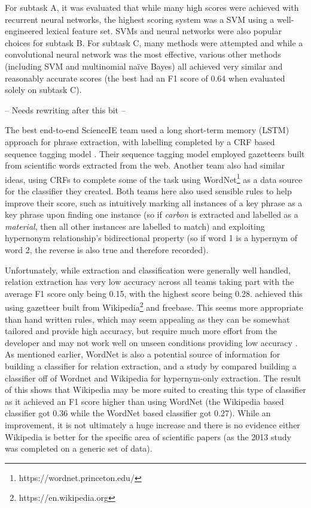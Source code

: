 For subtask A, it was evaluated that while many high scores were achieved with recurrent neural networks, the highest scoring system was a SVM using a well-engineered lexical feature set. SVMs and neural networks were also popular choices for subtask B. For subtask C, many methods were attempted and while a convolutional neural network was the most effective, various other methods (including SVM and multinomial naïve Bayes) all achieved very similar and reasonably accurate scores (the best had an F1 score of 0.64 when evaluated solely on subtask C).

-- Needs rewriting after this bit --

The best end-to-end ScienceIE team used a long short-term memory (LSTM) approach for phrase extraction, with labelling completed by a CRF based sequence tagging model \cite{Ammar2017}. Their sequence tagging model employed gazetteers built from scientific words extracted from the web. Another team \cite{Marsi2017} also had similar ideas, using CRFs to complete some of the task using WordNet\footnote{https://wordnet.princeton.edu/} as a data source for the classifier they created. Both teams here also used sensible rules to help improve their score, such as intuitively marking all instances of a key phrase as a key phrase upon finding one instance (so if \textit{carbon} is extracted and labelled as a \textit{material}, then all other instances are labelled to match) and exploiting hypernonym relationship’s bidirectional property (so if word 1 is a hypernym of word 2, the reverse is also true and therefore recorded). 

Unfortunately, while extraction and classification were generally well handled, relation extraction has very low accuracy across all teams taking part with the average F1 score only being 0.15, with the highest score being 0.28. \cite{Ammar2017} achieved this using gazetteer built from Wikipedia\footnote{https://en.wikipedia.org} and freebase. This seems more appropriate than hand written rules, which may seem appealing as they can be somewhat tailored and provide high accuracy, but require much more effort from the developer and may not work well on unseen conditions providing low accuracy \cite{Manning2012}. As mentioned earlier, WordNet is also a potential source of information for building a classifier for relation extraction, and a study by \cite{Snow2013} compared building a classifier off of Wordnet and Wikipedia for hypernym-only extraction. The result of this shows that Wikipedia may be more suited to creating this type of classifier as it achieved an F1 score higher than using WordNet (the Wikipedia based classifier got 0.36 while the WordNet based classifier got 0.27). While an improvement, it is not ultimately a huge increase and there is no evidence either Wikipedia is better for the specific area of scientific papers (as the 2013 study was completed on a generic set of data).

